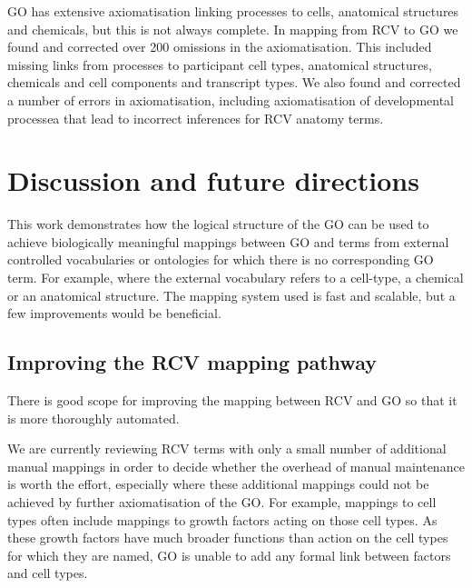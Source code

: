 \documentclass[runningheads,a4paper]{llncs}
\begin{document}
{GO has extensive axiomatisation linking processes to cells, anatomical structures and chemicals, but this is not always complete.  In mapping from RCV to GO we found and corrected over 200 omissions in the axiomatisation.  This included missing links from processes to participant cell types, anatomical structures, chemicals and cell components and transcript types.  We also found and corrected a number of errors in axiomatisation, including axiomatisation of developmental processea that lead to incorrect inferences for RCV anatomy terms.



\section{Discussion and future directions}

This work demonstrates how the logical structure of the \ac{GO} can be used to achieve biologically meaningful mappings between \ac{GO} and terms from external controlled vocabularies or ontologies for which there is no corresponding \ac{GO} term.  For example, where the external vocabulary refers to a cell-type, a chemical or an anatomical structure.  The mapping system used is fast and scalable,  but a few improvements would be beneficial.

\subsection{Improving the RCV mapping pathway}

There is good scope for improving the mapping between RCV and \ac{GO} so that it is more thoroughly automated. 

We are currently reviewing RCV terms with only a small number of additional manual mappings in order to decide whether the overhead of manual maintenance is worth the effort, especially where these additional mappings could not be achieved by further axiomatisation of the \ac{GO}.  For example, mappings to cell types often include mappings to growth factors acting on those cell types.  As these growth factors have much broader functions than action on the cell types for which they are named, \ac{GO} is unable to add any formal link between factors and cell types.

}
\end{document}
